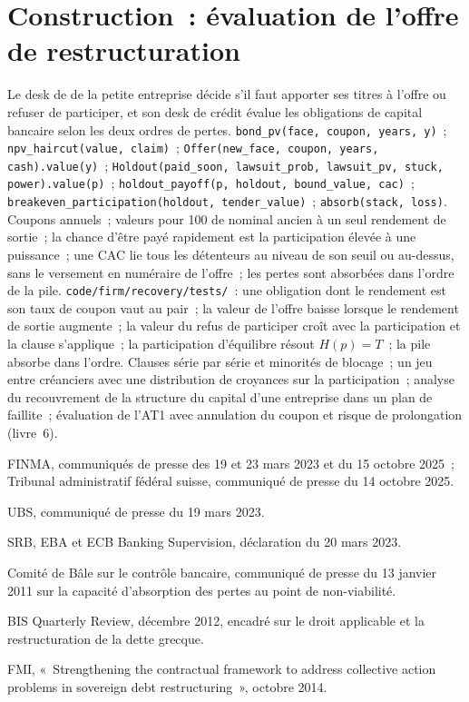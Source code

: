 \section{Construction~: évaluation de l'offre de restructuration}\label{bld:m2:distressed-sovereign-and-bank-capital-credit:recovery}

\begin{build}
 Le desk de  de la petite entreprise décide s'il faut apporter ses titres à l'offre
ou refuser de participer, et son desk de crédit évalue les obligations de capital bancaire selon les deux ordres de pertes.
 \texttt{bond\_pv(face, coupon, years, y)}~; \texttt{npv\_haircut(value,
claim)}~; \texttt{Offer(new\_face, coupon, years, cash).value(y)}~;
\texttt{Holdout(paid\_soon, lawsuit\_prob, lawsuit\_pv, stuck, power).value(p)}~;
\texttt{holdout\_payoff(p, holdout, bound\_value, cac)}~;
\texttt{breakeven\_participation(holdout, tender\_value)}~; \texttt{absorb(stack, loss)}.
 Coupons annuels~; valeurs pour 100 de nominal ancien à un seul rendement de sortie~; la chance
d'être payé rapidement est la participation élevée à une puissance~; une CAC lie tous les détenteurs
au niveau de son seuil ou au-dessus, sans le versement en numéraire de l'offre~; les pertes sont absorbées dans l'ordre de la pile.
 \texttt{code/firm/recovery/tests/}~: une obligation dont le rendement est son taux de coupon
vaut au pair~; la valeur de l'offre baisse lorsque le rendement de sortie augmente~; la valeur du refus de participer croît
avec la participation et la clause s'applique~; la participation d'équilibre résout $H(p) = T$~; la pile
absorbe dans l'ordre.
 Clauses série par série et minorités de blocage~; un jeu entre créanciers
avec une distribution de croyances sur la participation~; analyse du recouvrement de la structure du capital d'une entreprise
dans un plan de faillite~; évaluation de l'AT1 avec annulation du coupon et
risque de prolongation (livre~6).
\end{build}

\begin{omsources}
\item FINMA, communiqués de presse des 19 et 23 mars 2023 et du 15 octobre 2025~; Tribunal administratif
fédéral suisse, communiqué de presse du 14 octobre 2025.
\item UBS, communiqué de presse du 19 mars 2023.
\item SRB, EBA et ECB Banking Supervision, déclaration du 20 mars 2023.
\item Comité de Bâle sur le contrôle bancaire, communiqué de presse du 13 janvier 2011 sur la capacité
d'absorption des pertes au point de non-viabilité.
\item BIS Quarterly Review, décembre 2012, encadré sur le droit applicable et la restructuration
de la dette grecque.
\item FMI, «~Strengthening the contractual framework to address collective action
problems in sovereign debt restructuring~», octobre 2014.
\end{omsources}

